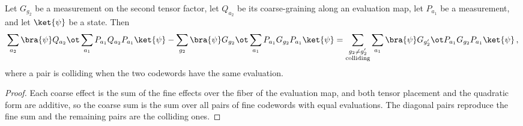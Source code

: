 \begin{lemma}
	\label{lem:pasting-pinched-collision-split}
	\leanok
	Let $G_{g_2}$ be a measurement on the second tensor factor, let $Q_{a_2}$ be
	its coarse-graining along an evaluation map, let $P_{a_1}$ be a measurement,
	and let $\ket{\psi}$ be a state. Then
	\[
		\sum_{a_2} \bra{\psi} Q_{a_2} \ot
				\sum_{a_1} P_{a_1} Q_{a_2} P_{a_1} \ket{\psi}
			- \sum_{g_2} \bra{\psi} G_{g_2} \ot
				\sum_{a_1} P_{a_1} G_{g_2} P_{a_1} \ket{\psi}
			= \sum_{\substack{g_2 \neq g_2' \\ \text{colliding}}} \sum_{a_1}
				\bra{\psi} G_{g_2'} \ot P_{a_1} G_{g_2} P_{a_1} \ket{\psi}\,,
	\]
	where a pair is colliding when the two codewords have the same evaluation.
\end{lemma}
\begin{proof}
	\leanok
	Each coarse effect is the sum of the fine effects over the fiber of the
	evaluation map, and both tensor placement and the quadratic form are
	additive, so the coarse sum is the sum over all pairs of fine codewords with
	equal evaluations. The diagonal pairs reproduce the fine sum and the
	remaining pairs are the colliding ones.
\end{proof}

